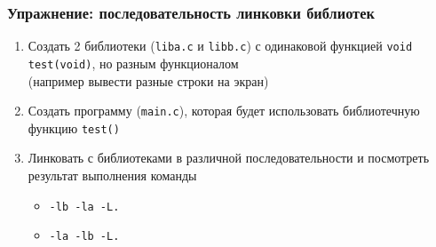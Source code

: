 

\begin{frame}
	\frametitle{Упражнение: последовательность линковки библиотек}

	\begin{enumerate}
		\item Создать 2 библиотеки ({\tt liba.c} и {\tt libb.c})
			с одинаковой функцией {\tt void test(void)}, но разным функционалом\\
			(например вывести разные строки на экран)
		\item Создать программу ({\tt main.c}), которая будет использовать 
			библиотечную функцию {\tt test()}
		\item Линковать с библиотеками в различной последовательности и 
			посмотреть результат выполнения команды
			\begin{itemize}
				\item {\tt -lb -la -L.}
				\item {\tt -la -lb -L.}
			\end{itemize}
	\end{enumerate}
\end{frame}



